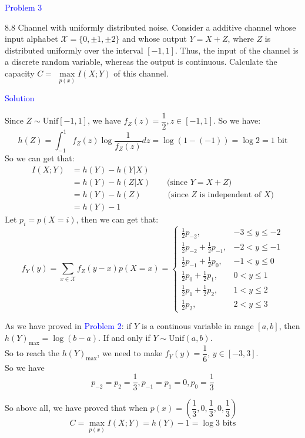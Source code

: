 \textcolor{blue}{Problem 3}

8.8 Channel with uniformly distributed noise. Consider a additive channel whose input alphabet $\mathcal{X}=\{0, \pm 1, \pm 2\}$ and whose output $Y=X+Z$, where $Z$ is distributed uniformly over the interval $[-1,1]$. Thus, the input of the channel is a discrete random variable, whereas the output is continuous. Calculate the capacity $C=$ $\max\limits_{p(x)} I(X ; Y)$ of this channel.

\textcolor{blue}{Solution}

Since $Z\sim\text{Unif}[-1,1]$, we have $f_Z(z)=\dfrac{1}{2},z\in[-1,1]$. So we have:
$$h(Z)=\int_{-1}^{1}f_Z(z)\log\dfrac{1}{f_Z(z)}dz=\log\left(1-(-1)\right)=\log 2=1\text{ bit}$$
So we can get that:
\begin{align*}
I(X;Y) &= h(Y)-h(Y|X) \\
&= h(Y) - h(Z|X) \qquad \text{(since $Y=X+Z$)} \\
&= h(Y) - h(Z) \qquad\quad\ \text{(since $Z$ is independent of $X$)} \\
&= h(Y) - 1
\end{align*}
Let $p_i=p(X=i)$, then we can get that:
$$f_Y(y) = \sum_{x\in\mathcal{X}}f_Z(y-x)p(X=x)=\begin{cases}
\frac{1}{2}p_{-2}, & -3\leq y\leq -2 \\
\frac{1}{2}p_{-2}+\frac{1}{2}p_{-1}, & -2<y\leq -1 \\
\frac{1}{2}p_{-1}+\frac{1}{2}p_0, & -1<y\leq 0 \\
\frac{1}{2}p_0+\frac{1}{2}p_1, & 0<y\leq 1 \\
\frac{1}{2}p_1+\frac{1}{2}p_2, & 1<y\leq 2 \\
\frac{1}{2}p_2, & 2<y\leq 3
\end{cases}$$

As we have proved in \textcolor{blue}{Problem 2}: if $Y$ is a continous variable in range $[a,b]$, then $h(Y)_{\max}=\log (b-a)$. If and only if $Y\sim\text{Unif}(a,b)$. \\
So to reach the $h(Y)_{\max}$, we need to make $f_Y(y)=\dfrac{1}{6}$, $y\in[-3,3]$. \\
So we have
$$p_{-2}=p_2=\dfrac{1}{3}, p_{-1}=p_1=0, p_0=\dfrac{1}{3}$$

So above all, we have proved that when $p(x)=\left(\dfrac{1}{3},0,\dfrac{1}{3},0,\dfrac{1}{3}\right)$
$$C=\max_{p(x)}I(X;Y)=h(Y)-1=\log 3\text{ bits}$$

\newpage